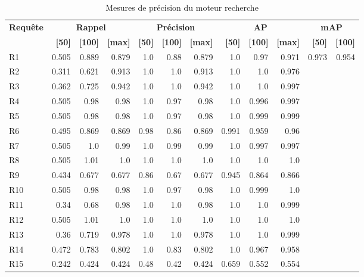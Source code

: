 \begin{table}[H]
\centering
\begin{tabular}{l|rrr|rrr|rrr|rr}
\toprule
\textbf{Requête} & \multicolumn{3}{c}{\textbf{Rappel}} & \multicolumn{3}{c}{\textbf{Précision}} & \multicolumn{3}{c}{\textbf{AP}} & \multicolumn{2}{c}{\textbf{mAP}} \\
 & \textbf{[50]} & \textbf{[100]} & \textbf{[max]} & \textbf{[50]} & \textbf{[100]} & \textbf{[max]} & \textbf{[50]} & \textbf{[100]} & \textbf{[max]} & \textbf{[50]} & \textbf{[100]} \\
\midrule
R1 & 0.505 & 0.889 & 0.879 & 1.0 & 0.88 & 0.879 & 1.0 & 0.97 & 0.971 & \multirow{15}{*}{0.973} & \multirow{15}{*}{0.954} \\
R2 & 0.311 & 0.621 & 0.913 & 1.0 & 1.0 & 0.913 & 1.0 & 1.0 & 0.976 \\
R3 & 0.362 & 0.725 & 0.942 & 1.0 & 1.0 & 0.942 & 1.0 & 1.0 & 0.997 \\
R4 & 0.505 & 0.98 & 0.98 & 1.0 & 0.97 & 0.98 & 1.0 & 0.996 & 0.997 \\
R5 & 0.505 & 0.98 & 0.98 & 1.0 & 0.97 & 0.98 & 1.0 & 0.999 & 0.999 \\
R6 & 0.495 & 0.869 & 0.869 & 0.98 & 0.86 & 0.869 & 0.991 & 0.959 & 0.96 \\
R7 & 0.505 & 1.0 & 0.99 & 1.0 & 0.99 & 0.99 & 1.0 & 0.997 & 0.997 \\
R8 & 0.505 & 1.01 & 1.0 & 1.0 & 1.0 & 1.0 & 1.0 & 1.0 & 1.0 \\
R9 & 0.434 & 0.677 & 0.677 & 0.86 & 0.67 & 0.677 & 0.945 & 0.864 & 0.866 \\
R10 & 0.505 & 0.98 & 0.98 & 1.0 & 0.97 & 0.98 & 1.0 & 0.999 & 1.0 \\
R11 & 0.34 & 0.68 & 0.98 & 1.0 & 1.0 & 0.98 & 1.0 & 1.0 & 0.999 \\
R12 & 0.505 & 1.01 & 1.0 & 1.0 & 1.0 & 1.0 & 1.0 & 1.0 & 1.0 \\
R13 & 0.36 & 0.719 & 0.978 & 1.0 & 1.0 & 0.978 & 1.0 & 1.0 & 0.999 \\
R14 & 0.472 & 0.783 & 0.802 & 1.0 & 0.83 & 0.802 & 1.0 & 0.967 & 0.958 \\
R15 & 0.242 & 0.424 & 0.424 & 0.48 & 0.42 & 0.424 & 0.659 & 0.552 & 0.554 \\
\bottomrule
\end{tabular}
\caption{Mesures de précision du moteur recherche}
\label{tab:results}
\end{table}
